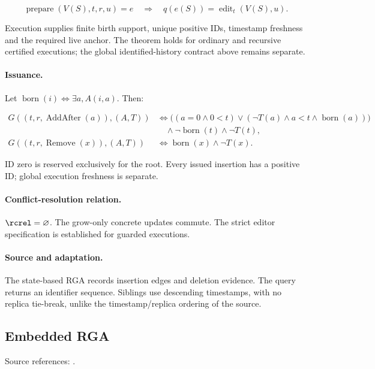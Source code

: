 \[
\operatorname{prepare}(V(S),t,r,u)=e\quad\Longrightarrow\quad q(e(S))=\operatorname{edit}_t(V(S),u).
\]


Execution supplies finite birth support, unique positive IDs, timestamp freshness and the required live anchor. The theorem holds for ordinary and recursive certified executions; the global identified-history contract above remains separate.

\paragraph{Issuance.}
Let $\operatorname{born}(i)\iff\exists a, A(i,a)$. Then:

\[
\begin{aligned}G((t,r,\operatorname{AddAfter}(a)),(A,T))&\iff\big((a=0\land 0<t)\lor(\neg T(a)\land a<t\land\operatorname{born}(a))\big)\\&\quad\land\neg\operatorname{born}(t)\land\neg T(t),\\G((t,r,\operatorname{Remove}(x)),(A,T))&\iff\operatorname{born}(x)\land\neg T(x).\end{aligned}
\]


ID zero is reserved exclusively for the root. Every issued insertion has a positive ID; global execution freshness is separate.


\paragraph{Conflict-resolution relation.}
$\rcrel=\varnothing$. The grow-only concrete updates commute. The strict editor specification is established for guarded executions.


\paragraph{Source and adaptation.}
The state-based RGA records insertion edges and deletion evidence. The query
returns an identifier sequence. Siblings use descending timestamps, with no
replica tie-break, unlike the timestamp/replica ordering of the source.


\subsection{Embedded RGA}
\label{app:dt-embed-rga}

\noindent Source references: \cite{Roh}.


